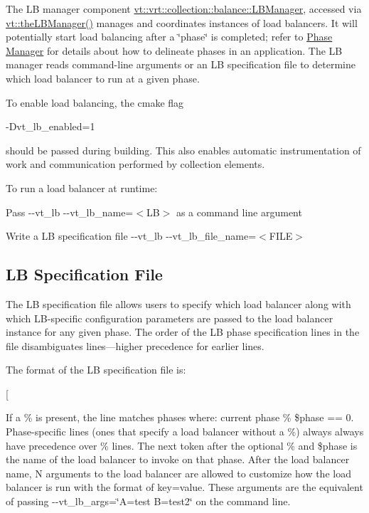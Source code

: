 The LB manager component {\ttfamily \hyperlink{structvt_1_1vrt_1_1collection_1_1balance_1_1_l_b_manager}{vt\+::vrt\+::collection\+::balance\+::\+L\+B\+Manager}}, accessed via {\ttfamily \hyperlink{namespacevt_a05187076eac8c66c9951b062b0955520}{vt\+::the\+L\+B\+Manager()}} manages and coordinates instances of load balancers. It will potentially start load balancing after a \char`\"{}phase\char`\"{} is completed; refer to \hyperlink{phase}{Phase Manager} for details about how to delineate phases in an application. The LB manager reads command-\/line arguments or an LB specification file to determine which load balancer to run at a given phase.

To enable load balancing, the cmake flag
\begin{DoxyCode}
-Dvt\_lb\_enabled=1
\end{DoxyCode}
 should be passed during building. This also enables automatic instrumentation of work and communication performed by collection elements.

To run a load balancer at runtime\+:
\begin{DoxyItemize}
\item Pass {\ttfamily -\/-\/vt\+\_\+lb -\/-\/vt\+\_\+lb\+\_\+name=$<$LB$>$} as a command line argument
\item Write a LB specification file {\ttfamily -\/-\/vt\+\_\+lb -\/-\/vt\+\_\+lb\+\_\+file\+\_\+name=$<$F\+I\+LE$>$}
\end{DoxyItemize}\hypertarget{lb-manager_lb-specification-file}{}\subsection{L\+B Specification File}\label{lb-manager_lb-specification-file}
The LB specification file allows users to specify which load balancer along with which L\+B-\/specific configuration parameters are passed to the load balancer instance for any given phase. The order of the LB phase specification lines in the file disambiguates lines---higher precedence for earlier lines.

The format of the LB specification file is\+:


\begin{DoxyCode}
[%
\end{DoxyCode}


If a {\ttfamily \%} is present, the line matches phases where\+: {\ttfamily current phase \% \$phase == 0}. Phase-\/specific lines (ones that specify a load balancer without a {\ttfamily \%}) always always have precedence over {\ttfamily \%} lines. The next token after the optional {\ttfamily \%} and {\ttfamily \$phase} is the name of the load balancer to invoke on that phase. After the load balancer name, {\ttfamily N} arguments to the load balancer are allowed to customize how the load balancer is run with the format of {\ttfamily key=value}. These arguments are the equivalent of passing {\ttfamily -\/-\/vt\+\_\+lb\+\_\+args=\char`\"{}\+A=test B=test2\char`\"{}} on the command line.

